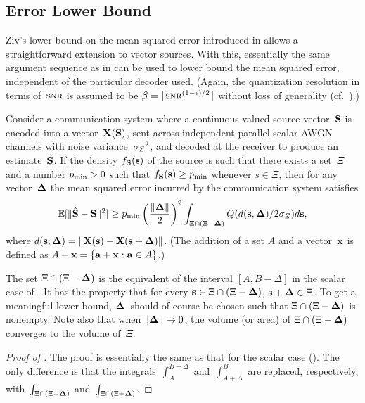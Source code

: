 \subsection{Error Lower Bound}

Ziv's lower bound on the mean squared error introduced in 
allows a straightforward extension to vector sources. With this, essentially the
same argument sequence as in  can be used to lower bound the
mean squared error, independent of the particular decoder used.  (Again,
the quantization resolution in terms of~$\snr$ is assumed to be $\beta = \lceil
\snr^{(1-\e)/2} \rceil$ without loss of generality (cf.~).)

\begin{lemma}
  \label{lem:zivboundvec}
  Consider a communication system where a continuous-valued source vector~$\S$
  is encoded into a vector~$\X(\S)$, sent across independent parallel scalar
  AWGN channels with noise variance~$\szq$, and decoded at the receiver to
  produce an estimate~$\Shv$. If the density $f_{\S}(\s)$ of the source is such
  that there exists a set~$\Xi$ and a number $\pmin > 0$ such that $f_{\S}(\s)
  \ge \pmin$ whenever $s \in \Xi$, then for any vector~$\Dv$ the mean squared
  error incurred by the communication system satisfies
  \begin{equation*}
    \msev \ge \pmin  \left( \frac{\|\Dv\|}{2}\right)^2 \int_{\Xi \cap (\Xi -
    \Dv)} Q(d(\s, \Dv)/2 \sz) d\s,
  \end{equation*}
  where $d(\s,\Dv) = \|\X(\s) - \X(\s + \Dv)\|$. (The addition of a set $A$ and
  a vector~$\x$ is defined as $A + \x = \{\vect{a} + \x : \vect{a} \in A\}$.)
\end{lemma}

\begin{remark}
  \label{rem:zivboundvec}
  The set $\Xi \cap (\Xi - \Dv)$ is the equivalent of the interval $[A,
  B-\Delta]$ in the scalar case of . It has the property that
  for every $\s \in \Xi \cap (\Xi - \Dv)$, $\s + \Dv \in \Xi$. To get a
  meaningful lower bound, $\Dv$~should of course be chosen such that $\Xi \cap
  (\Xi - \Dv)$ is nonempty.  Note also that when $\|\Dv\| \goesto 0$, the volume
  (or area) of $\Xi \cap (\Xi - \Dv)$ converges to the volume of~$\Xi$.
\end{remark}

\begin{proof}[Proof of ]
  The proof is essentially the same as that for the scalar case
  (). The only difference is that the
  integrals~$\int_A^{B-\Delta}$ and~$\int_{A+\Delta}^B$ are replaced,
  respectively, with~$\int_{\Xi \cap (\Xi - \Dv)}$ and~$\int_{\Xi \cap (\Xi +
  \Dv)}$.
\end{proof}

